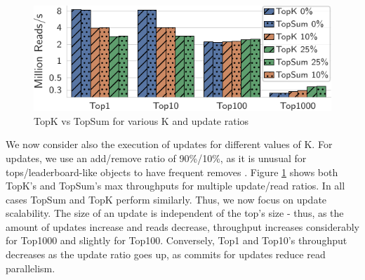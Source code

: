 \documentclass[sigconf, nonacm]{acmart}
\begin{document}
\begin{figure}
	\centering
	\includegraphics[width=0.76\linewidth]{singleQuery/topk_vs_topsum_5b}
	\vspace*{-0.6em}
	\caption{TopK vs TopSum for various K and update ratios}
	\label{fig:topKVSTopSum}
	\vspace*{-0.75em}
\end{figure}

We now consider also the execution of updates for different values of K.
For updates, we use an add/remove ratio of 90\%/10\%, as it is unusual for tops/leaderboard-like objects to have frequent removes \cite{Cabrita17Nonuniform}.
Figure \ref{fig:topKVSTopSum} shows both TopK's and TopSum's max throughputs for multiple update/read ratios.
In all cases TopSum and TopK perform similarly.
Thus, we now focus on update scalability.
The size of an update is independent of the top's size - thus, as the amount of updates increase and reads decrease, throughput increases considerably for Top1000 and slightly for Top100.
Conversely, Top1 and Top10's throughput decreases as the update ratio goes up, %
as commits for updates reduce read parallelism.
\end{document}
